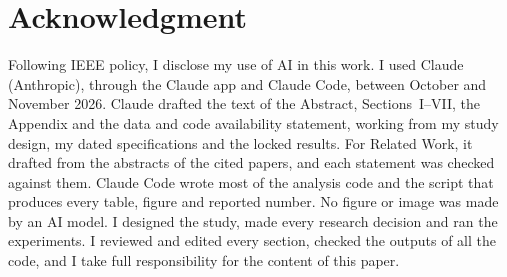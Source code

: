 \documentclass[conference]{IEEEtran}
\begin{document}















\section*{Acknowledgment}
Following IEEE policy, I disclose my use of AI in this work. I used Claude
(Anthropic), through the Claude app and Claude Code, between October and
November 2026. Claude drafted the text of the Abstract, Sections~I--VII, the
Appendix and the data and code availability statement, working from my study
design, my dated specifications and the locked results. For Related Work, it
drafted from the abstracts of the cited papers, and each statement was
checked against them. Claude Code wrote most of the analysis code and the
script that produces every table, figure and reported number. No figure or
image was made by an AI model. I designed the study, made every research
decision and ran the experiments. I reviewed and edited every section,
checked the outputs of all the code, and I take full responsibility for the
content of this paper.


\end{document}
